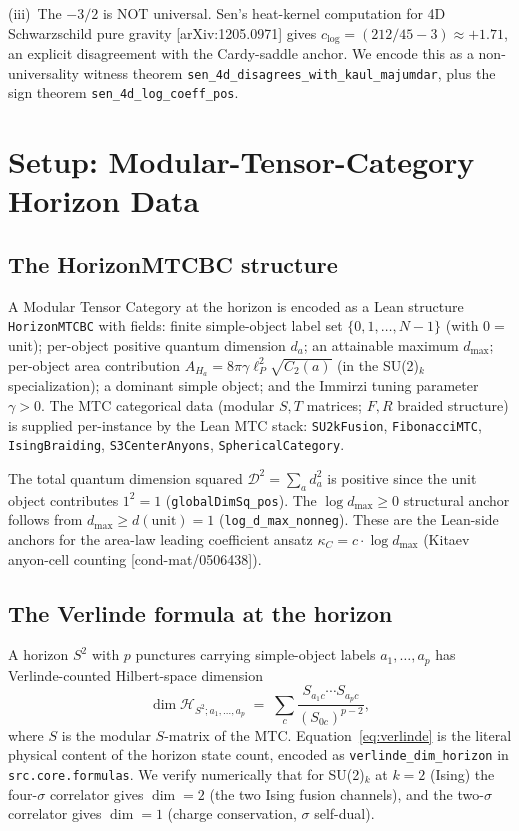 \documentclass[aps,prd,twocolumn,showpacs,superscriptaddress,nofootinbib]{revtex4-2}
\newcommand{\AH}{A_H}
\newcommand{\Imm}{\gamma}
\newcommand{\dmax}{d_{\max}}
\newcommand{\Dsq}{\mathcal{D}^2}
\begin{document}
(iii)~The $-3/2$ is NOT universal. Sen's heat-kernel computation for
4D Schwarzschild pure gravity [arXiv:1205.0971] gives
$c_{\log} = (212/45 - 3) \approx +1.71$, an explicit disagreement with
the Cardy-saddle anchor. We encode this as a non-universality witness
theorem \texttt{sen\_4d\_disagrees\_with\_kaul\_majumdar}, plus the
sign theorem \texttt{sen\_4d\_log\_coeff\_pos}.

\section{Setup: Modular-Tensor-Category Horizon Data}
\label{sec:setup}

\subsection{The HorizonMTCBC structure}

A Modular Tensor Category at the horizon is encoded as a Lean
structure \texttt{HorizonMTCBC} with fields:
finite simple-object label set $\{0, 1, \ldots, N-1\}$ (with $0 = $
unit); per-object positive quantum dimension $d_a$; an attainable
maximum $\dmax$; per-object area contribution
$\AH_a = 8\pi \Imm \ell_P^2 \sqrt{C_2(a)}$ (in the SU(2)$_k$
specialization); a dominant simple object; and the Immirzi tuning
parameter $\Imm > 0$. The MTC categorical data (modular $S, T$
matrices; $F, R$ braided structure) is supplied per-instance by the
Lean MTC stack: \texttt{SU2kFusion}, \texttt{FibonacciMTC},
\texttt{IsingBraiding}, \texttt{S3CenterAnyons},
\texttt{SphericalCategory}.

The total quantum dimension squared $\Dsq = \sum_a d_a^2$ is positive
since the unit object contributes $1^2 = 1$
(\texttt{globalDimSq\_pos}). The $\log\dmax \geq 0$ structural anchor
follows from $\dmax \geq d(\text{unit}) = 1$
(\texttt{log\_d\_max\_nonneg}). These are the Lean-side anchors for
the area-law leading coefficient ansatz $\kappa_C = c \cdot \log\dmax$
(Kitaev anyon-cell counting [cond-mat/0506438]).

\subsection{The Verlinde formula at the horizon}

A horizon $S^2$ with $p$ punctures carrying simple-object labels
$a_1, \ldots, a_p$ has Verlinde-counted Hilbert-space dimension
\begin{equation}
\dim \mathcal{H}_{S^2; a_1, \ldots, a_p} \;=\;
\sum_c \frac{S_{a_1 c} \cdots S_{a_p c}}{(S_{0 c})^{p-2}},
\label{eq:verlinde}
\end{equation}
where $S$ is the modular $S$-matrix of the MTC. Equation~\eqref{eq:verlinde}
is the literal physical content of the horizon state count, encoded as
\texttt{verlinde\_dim\_horizon} in \texttt{src.core.formulas}. We
verify numerically that for SU(2)$_k$ at $k = 2$ (Ising) the four-$\sigma$
correlator gives $\dim = 2$ (the two Ising fusion channels), and the
two-$\sigma$ correlator gives $\dim = 1$ (charge conservation,
$\sigma$ self-dual).
\end{document}
